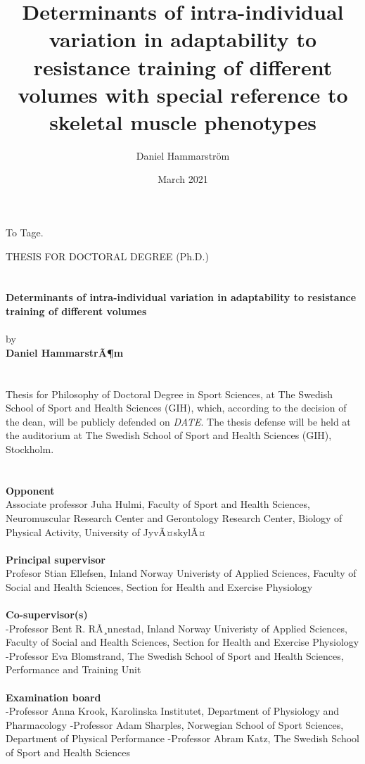\documentclass[twoside,10pt]{gihclass} %
\title{Determinants of intra-individual variation in adaptability to resistance training of different volumes with special reference to skeletal muscle phenotypes}
\author{Daniel Hammarström}
\date{March 2021}
\begin{document}


\frontmatter %
  \maketitle
  \begin{dedication}
\vspace*{\fill}
 To Tage.
\vspace*{\fill}
  \end{dedication}
\begin{defence}
    THESIS FOR DOCTORAL DEGREE (Ph.D.)\\
    ~\\
    ~\\
    \textbf{Determinants of intra-individual variation in adaptability to resistance training of different volumes}\\
    ~\\
    by\\
    \textbf{Daniel HammarstrÃ¶m}\\
    ~\\
    ~\\
    Thesis for Philosophy of Doctoral Degree in Sport Sciences, at The Swedish School of Sport and Health Sciences (GIH), which, according to the decision of the dean, will be publicly defended on \emph{DATE}. The thesis defense will be held at the auditorium at The Swedish School of Sport and Health Sciences (GIH), Stockholm.\\
    ~\\
    ~\\
    \textbf{Opponent}\\
    Associate professor Juha Hulmi, Faculty of Sport and Health Sciences, Neuromuscular Research Center and Gerontology Research Center, Biology of Physical Activity, University of JyvÃ¤skylÃ¤\\
    ~\\
    \textbf{Principal supervisor}\\
    Profesor Stian Ellefsen, Inland Norway Univeristy of Applied Sciences, Faculty of Social and Health Sciences, Section for Health and Exercise Physiology\\
    ~\\
    \textbf{Co-supervisor(s)}\\
    -Professor Bent R. RÃ¸nnestad, Inland Norway Univeristy of Applied Sciences, Faculty of Social and Health Sciences, Section for Health and Exercise Physiology
    -Professor Eva Blomstrand, The Swedish School of Sport and Health Sciences, Performance and Training Unit\\
    ~\\
    \textbf{Examination board}\\
    -Professor Anna Krook, Karolinska Institutet, Department of Physiology and Pharmacology
    -Professor Adam Sharples, Norwegian School of Sport Sciences, Department of Physical Performance
    -Professor Abram Katz, The Swedish School of Sport and Health Sciences
  \end{defence}
\end{document}
